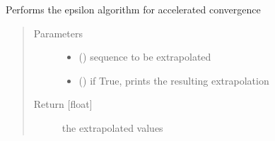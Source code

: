 \documentclass[letterpaper,10pt,english]{sphinxmanual}
\begin{document}
\begin{fulllineitems}
\label{\detokenize{functions:pyqcm.epsilon}}
\sphinxAtStartPar
Performs the epsilon algorithm for accelerated convergence
\begin{quote}\begin{description}
\item[{Parameters}] \leavevmode\begin{itemize}
\item {} 
\sphinxAtStartPar
{} (\sphinxstyleliteralemphasis{\sphinxupquote{{[}}}\sphinxstyleliteralemphasis{\sphinxupquote{{]}}}) \textendash{} sequence to be extrapolated

\item {} 
\sphinxAtStartPar
{} () \textendash{} if True, prints the resulting extrapolation

\end{itemize}

\item[{Return {[}float{]}}] \leavevmode
\sphinxAtStartPar
the extrapolated values

\end{description}\end{quote}

\end{fulllineitems}

\end{document}
